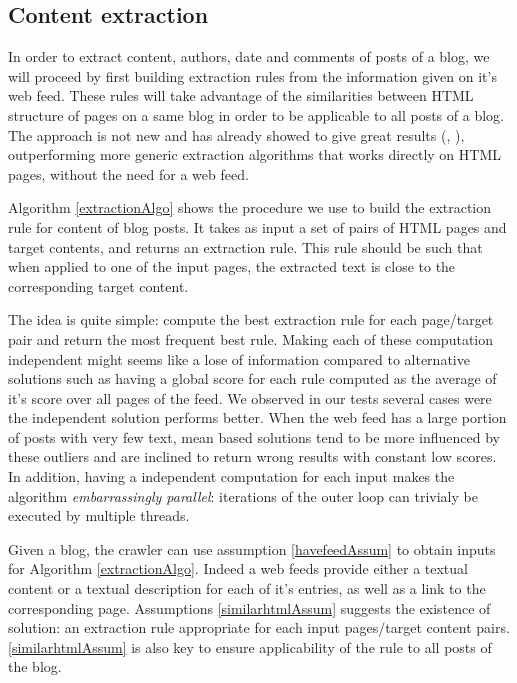 \subsection{Content extraction}
In order to extract content, authors, date and comments of posts of a blog, we will proceed by first building extraction rules from the information given on it's web feed. These rules will take advantage of the similarities between HTML structure of pages on a same blog in order to be applicable to all posts of a blog. The approach is not new and has already showed to give great results (\cite{gkotsis2013}, \cite{oita2010}), outperforming more generic extraction algorithms that works directly on HTML pages, without the need for a web feed.

\extractionAlgo

Algorithm \ref{extractionAlgo} shows the procedure we use to build the extraction rule for content of blog posts. It takes as input a set of pairs of HTML pages and target contents, and returns an extraction rule. This rule should be such that when applied to one of the input pages, the extracted text is close to the corresponding target content.

The idea is quite simple: compute the best extraction rule for each page/target pair and return the most frequent best rule. Making each of these computation independent might seems like a lose of information compared to alternative solutions such as having a global score for each rule computed as the average of it's score over all pages of the feed. We observed in our tests several cases were the independent solution performs better. When the web feed has a large portion of posts with very few text, mean based solutions tend to be more influenced by these outliers and are inclined to return wrong results with constant low scores. In addition, having a independent computation for each input makes the algorithm \emph{embarrassingly parallel}: iterations of the outer loop can trivialy be executed by multiple threads.

Given a blog, the crawler can use assumption \ref{havefeedAssum} to obtain inputs for Algorithm \ref{extractionAlgo}. Indeed a web feeds provide either a textual content or a textual description for each of it's entries, as well as a link to the corresponding page. Assumptions \ref{similarhtmlAssum} suggests the existence of solution: an extraction rule appropriate for each input pages/target content pairs. \ref{similarhtmlAssum} is also key to ensure applicability of the rule to all posts of the blog.


